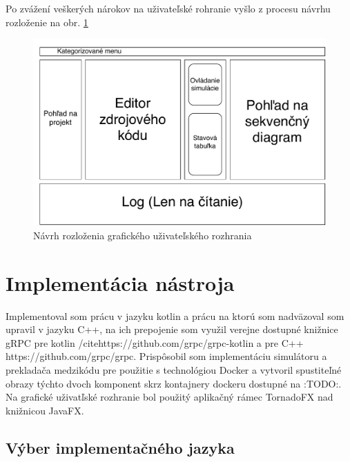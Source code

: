 Po zvážení veškerých nárokov na uživateľské rohranie vyšlo z procesu návrhu rozloženie na obr. \ref{fig:ui-layout}

\begin{figure}[H]
	\label{fig:ui-layout}
	\centering
	\includegraphics[scale=0.75]{obrazky-figures/UI-layout}
	\caption{Návrh rozloženia grafického uživateľského rozhrania}
\end{figure}



\chapter{Implementácia nástroja}

Implementoval som prácu v jazyku kotlin a prácu na ktorú som nadväzoval som upravil v jazyku C++, na ich prepojenie som využil verejne dostupné knižnice gRPC pre kotlin /cite{}https://github.com/grpc/grpc-kotlin a pre C++ \cite{}https://github.com/grpc/grpc. Prispôsobil som implementáciu simulátoru a prekladača medzikódu pre použitie s technológiou Docker a vytvoril spustiteľné obrazy týchto dvoch komponent skrz kontajnery dockeru dostupné na :TODO:. Na grafické uživatľské rozhranie bol použitý aplikačný rámec TornadoFX nad knižnicou JavaFX.

\section{Výber implementačného jazyka}

